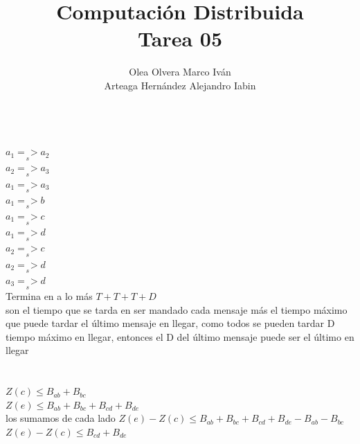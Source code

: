 \documentclass{article}
\title{Computación Distribuida \\ Tarea 05}
\author{Olea Olvera Marco Iván \\ Arteaga Hernández Alejandro Iabin}
\date{}
\begin{document}
\maketitle

\section{}
\\
$a_1 \underset{s}{=>} a_2$\\
$a_2 \underset{s}{=>} a_3$\\
$a_1 \underset{s}{=>} a_3$\\
$a_1 \underset{s}{=>} b$\\
$a_1 \underset{s}{=>} c$\\
$a_1 \underset{s}{=>} d$\\
$a_2 \underset{s}{=>} c$\\
$a_2 \underset{s}{=>} d$\\
$a_3 \underset{s}{=>} d$\\

Termina en a lo más $T+T+T+D$\\
son el tiempo que se tarda en ser mandado cada mensaje más el tiempo máximo que puede tardar el último mensaje en llegar, como todos se pueden tardar D tiempo máximo en llegar, entonces el D del último mensaje puede ser el último en llegar
\section{}
$Z(c) \leq  B_{ab}+B_{bc}$\\
$Z(e) \leq  B_{ab}+B_{bc}+ B_{cd}+B_{de}$\\
los sumamos de cada lado
$Z(e) - Z(c) \leq B_{ab}+B_{bc}+ B_{cd}+B_{de} - B_{ab}-B_{bc} $\\
$Z(e) - Z(c) \leq B_{cd}+B_{de} $
\end{document}
